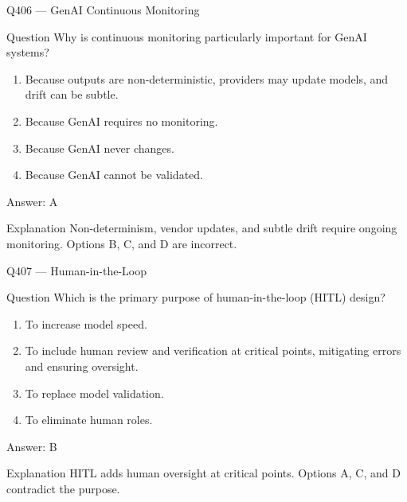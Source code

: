 \documentclass[aspectratio=169,8pt]{beamer}
\begin{document}
	\begin{frame}{Q406 --- GenAI Continuous Monitoring}
		\begin{block}{Question}
			Why is continuous monitoring particularly important for GenAI systems?
			\begin{enumerate}
				\item Because outputs are non-deterministic, providers may update models, and drift can be subtle.
				\item Because GenAI requires no monitoring.
				\item Because GenAI never changes.
				\item Because GenAI cannot be validated.
			\end{enumerate}
		\end{block}
		\begin{exampleblock}{Answer: A}\end{exampleblock}
		\begin{block}{Explanation}
			Non-determinism, vendor updates, and subtle drift require ongoing monitoring. Options B, C, and D are incorrect.
		\end{block}
	\end{frame}
	
	\begin{frame}{Q407 --- Human-in-the-Loop}
		\begin{block}{Question}
			Which is the primary purpose of human-in-the-loop (HITL) design?
			\begin{enumerate}
				\item To increase model speed.
				\item To include human review and verification at critical points, mitigating errors and ensuring oversight.
				\item To replace model validation.
				\item To eliminate human roles.
			\end{enumerate}
		\end{block}
		\begin{exampleblock}{Answer: B}\end{exampleblock}
		\begin{block}{Explanation}
			HITL adds human oversight at critical points. Options A, C, and D contradict the purpose.
		\end{block}
	\end{frame}
	
\end{document}
